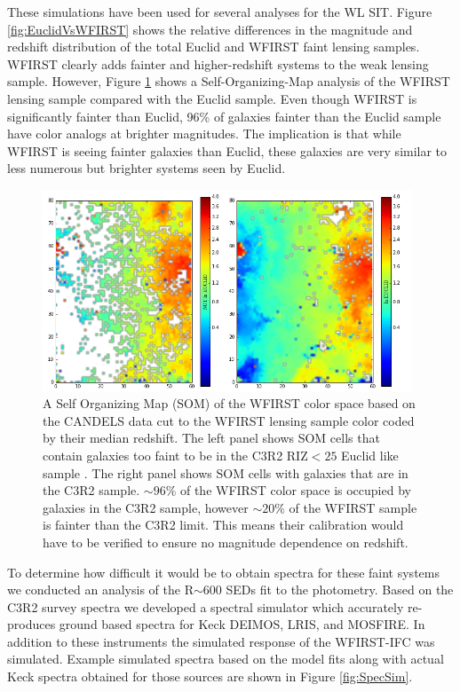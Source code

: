 These simulations have been used for several analyses for the WL SIT.  Figure \ref{fig:EuclidVsWFIRST} shows the relative differences in the magnitude and redshift distribution of the total Euclid and WFIRST faint lensing samples.  WFIRST clearly adds fainter and higher-redshift systems to the weak lensing sample.  However, Figure \ref{fig:WFIRSTSOM} shows a Self-Organizing-Map analysis \citep{Masters2015} of the WFIRST lensing sample compared with the Euclid sample. Even though WFIRST is significantly fainter than Euclid, 96\% of galaxies fainter than the Euclid sample have color analogs at brighter magnitudes.  The implication is that while WFIRST is seeing fainter galaxies than Euclid, these galaxies are very similar to less numerous but brighter systems seen by Euclid.

\begin{figure} 
\centering
 \includegraphics[trim=0cm 0cm 0cm 0cm, clip,width=0.98\textwidth] {./plots/SOM_WFIRST_EUCLID.png}
\caption{A Self Organizing Map (SOM) \citep{Masters2015} of the WFIRST color space based on the CANDELS data cut to the WFIRST lensing sample color coded by their median redshift.  The left panel shows SOM cells that contain galaxies too faint to be in the C3R2 RIZ$<25$ Euclid like sample \citep{Masters2015,Masters2017}.  The right panel shows SOM cells with galaxies that are in the C3R2 sample.  $\sim96\%$ of the WFIRST color space is occupied by galaxies in the C3R2 sample, however $\sim20\%$ of the WFIRST sample is fainter than the C3R2 limit.  This means their calibration would have to be verified to ensure no magnitude dependence on redshift. }
\label{fig:WFIRSTSOM}
\end{figure}

To determine how difficult it would be to obtain spectra for these faint systems we conducted an analysis of the R$\sim$600 SEDs fit to the photometry.  Based on the C3R2 survey spectra \citep{Masters2017} we developed a spectral simulator which accurately re-produces ground based spectra for Keck DEIMOS, LRIS, and MOSFIRE.  In addition to these instruments the simulated response of the WFIRST-IFC was simulated.  Example simulated spectra based on the model fits along with actual Keck spectra obtained for those sources are shown in Figure \ref{fig:SpecSim}.  

